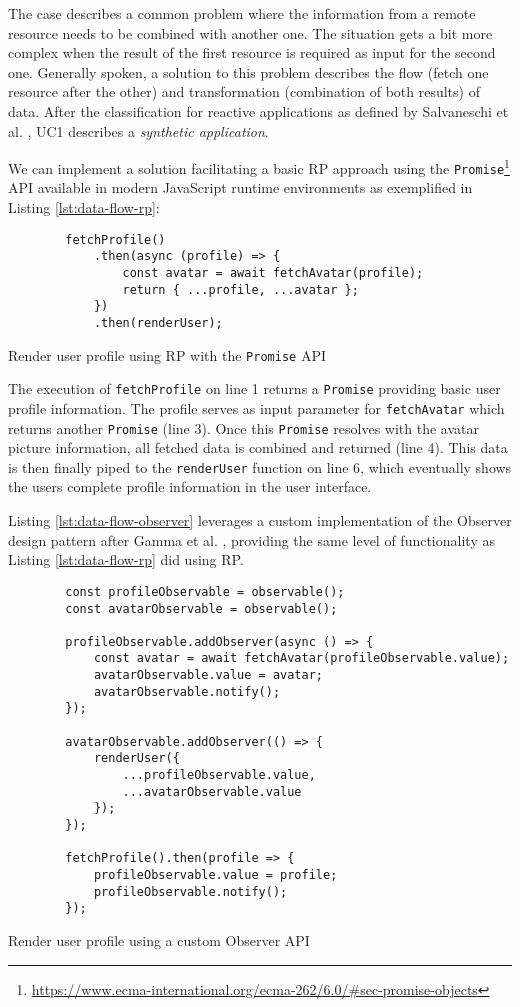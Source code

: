 \documentclass[12pt,a4paper]{article}
\begin{document}
The case describes a common problem where the information from a remote resource needs to be combined with another one. The situation gets a bit more complex when the result of the first resource is required as input for the second one. Generally spoken, a solution to this problem describes the flow (fetch one resource after the other) and transformation (combination of both results) of data. After the classification for reactive applications as defined by Salvaneschi et al. \cite{7827078}, UC1 describes a \emph{synthetic application}.

We can implement a solution facilitating a basic RP approach using the \texttt{Promise}\footnote{\url{https://www.ecma-international.org/ecma-262/6.0/\#sec-promise-objects}} API available in modern JavaScript runtime environments as exemplified in Listing \ref{lst:data-flow-rp}:

\begin{listing}[H]
	\begin{verbatim}
		fetchProfile()
			.then(async (profile) => {
				const avatar = await fetchAvatar(profile);
				return { ...profile, ...avatar };
			})
			.then(renderUser);
	\end{verbatim}
	\caption{Render user profile using RP with the \texttt{Promise} API}
	\label{lst:data-flow-rp}
\end{listing}

The execution of \texttt{fetchProfile} on line 1 returns a \texttt{Promise} providing basic user profile information. The profile serves as input parameter for \texttt{fetchAvatar} which returns another \texttt{Promise} (line 3). Once this \texttt{Promise} resolves with the avatar picture information, all fetched data is combined and returned (line 4). This data is then finally piped to the \texttt{renderUser} function on line 6, which eventually shows the users complete profile information in the user interface.

Listing \ref{lst:data-flow-observer} leverages a custom implementation of the Observer design pattern after Gamma et al. \cite{gamma1995design}, providing the same level of functionality as Listing \ref{lst:data-flow-rp} did using RP.

\begin{listing}[H]
	\begin{verbatim}
		const profileObservable = observable();
		const avatarObservable = observable();

		profileObservable.addObserver(async () => {
			const avatar = await fetchAvatar(profileObservable.value);
			avatarObservable.value = avatar;
			avatarObservable.notify();
		});

		avatarObservable.addObserver(() => {
			renderUser({
				...profileObservable.value,
				...avatarObservable.value
			});
		});

		fetchProfile().then(profile => {
			profileObservable.value = profile;
			profileObservable.notify();
		});
	\end{verbatim}
	\caption{Render user profile using a custom Observer API}
	\label{lst:data-flow-observer}
\end{listing}
\end{document}
